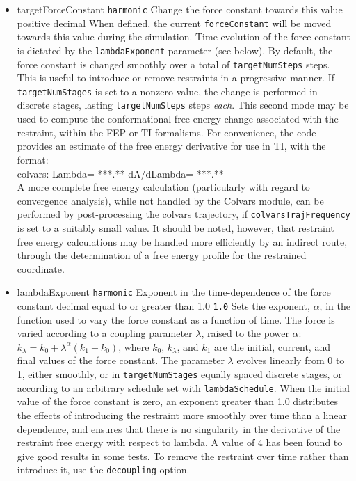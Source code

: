 \begin{itemize}

\item %
  \key
    {targetForceConstant}{%
    \texttt{harmonic}}{%
    Change the force constant towards this value}{%
    positive decimal}{%
    When defined, the current \texttt{forceConstant} will be moved towards
    this value during the simulation. Time evolution of the force constant
    is dictated by the \texttt{lambdaExponent} parameter (see below).
    By default, the force constant is changed smoothly over a total of
    \texttt{targetNumSteps} steps. This is useful to introduce or
    remove restraints in a progressive manner.
    If \texttt{targetNumStages} is set to a nonzero value, the
    change is performed in discrete stages, lasting \texttt{targetNumSteps}
    steps \emph{each}. This second mode may be used to compute the
    conformational free energy change associated with the restraint, within
    the FEP or TI formalisms. For convenience, the code provides an estimate
    of the free energy derivative for use in TI, with the format:\\
    {\ttfamily{}colvars:   Lambda= ***.** dA/dLambda= ***.**}\\
     A more complete free energy
    calculation (particularly with regard to convergence analysis),
    while not handled by the Colvars module, can be performed by post-processing
    the colvars trajectory, if \texttt{colvarsTrajFrequency} is set to a
    suitably small value. It should be noted, however, that restraint
    free energy calculations may be handled more efficiently by an
    indirect route, through the
    determination of a free energy profile for the restrained coordinate.\cite{Deng2009}}

\item %
  \keydef
    {lambdaExponent}{%
      \texttt{harmonic}}{%
      Exponent in the time-dependence of the force constant}{%
      decimal equal to or greater than 1.0}{%
    \texttt{1.0}}{%
    Sets the exponent, $\alpha$, in the function used to vary the force
    constant as a function of time. The force is varied according to a
    coupling parameter $\lambda$, raised to the power $\alpha$:
    $ k_\lambda = k_0 + \lambda^\alpha (k_1 - k_0)$, where $k_0$,
    $k_\lambda$, and $k_1$ are the initial, current, and final values
    of the force constant. The parameter $\lambda$ evolves linearly from
    0 to 1, either smoothly, or in \texttt{targetNumStages} equally spaced
    discrete stages, or according to an arbitrary schedule set with
    \texttt{lambdaSchedule}.
    When the initial value of the force constant is zero,
    an exponent greater than 1.0 distributes the effects of introducing the
    restraint more smoothly over time than a linear dependence, and
    ensures that there is no singularity in the derivative of the
    restraint free energy with respect to lambda. A value of 4 has
    been found to give good results in some tests.
    To remove the restraint over time rather than introduce it, use the
    \texttt{decoupling} option.}


\end{itemize}
